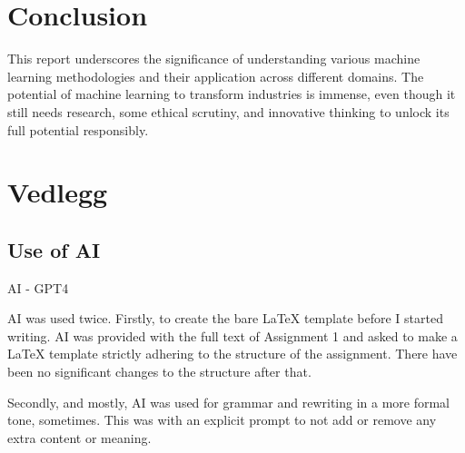 \documentclass[11pt, a4paper]{article}
\begin{document}
\section{Conclusion}

This report underscores the significance of understanding various machine learning methodologies and their application across different domains. The potential of machine learning to transform industries is immense, even though it still needs research, some ethical scrutiny, and innovative thinking to unlock its full potential responsibly.



\newpage
\section*{Vedlegg}
\subsection*{Use of AI}
AI - GPT4

AI was used twice. Firstly, to create the bare LaTeX template before I started writing. AI was provided with the full text of Assignment 1 and asked to make a LaTeX template strictly adhering to the structure of the assignment. There have been no significant changes to the structure after that.

Secondly, and mostly, AI was used for grammar and rewriting in a more formal tone, sometimes. This was with an explicit prompt to not add or remove any extra content or meaning.
\end{document}
